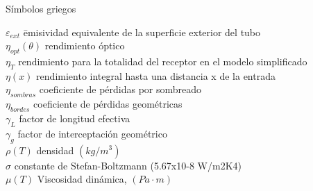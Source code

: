 Símbolos griegos

\begin{tabbing}
$\varepsilon_{ext}$ \quad\= emisividad equivalente de la superficie exterior del tubo \\
$\eta_{opt}(\theta)$  \> rendimiento óptico \\
$ \eta_{T}$ \> rendimiento para la totalidad del receptor en el modelo simplificado \\
$ \eta(x)$ \> rendimiento integral hasta una distancia x de la entrada \\
$\eta_{sombras}$ \> coeficiente de pérdidas por sombreado \\
$\eta_{bordes}$ \> coeficiente de pérdidas geométricas \\
$\gamma_L$ \>  factor de longitud efectiva \\
$\gamma_g$  \> factor de interceptación geométrico \\
$\rho(T)$ \> densidad $(kg/m^3)$ \\
$\sigma$ \> constante de Stefan-Boltzmann (5.67x10-8 W/m2K4) \\
$\mu(T)$ \> Viscosidad dinámica, $(Pa \cdot m)$ 
\end{tabbing}

